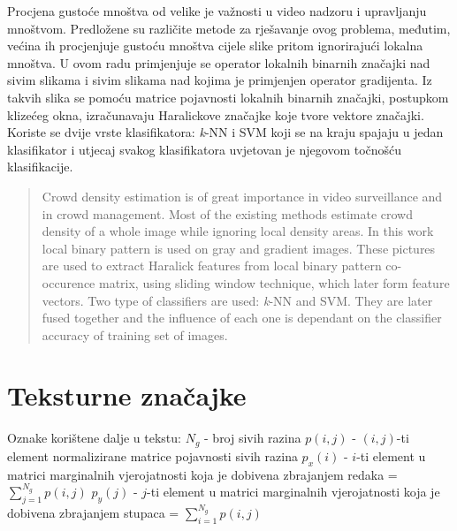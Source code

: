 \documentclass[times, utf8, zavrsni, numeric]{fer}
\begin{document}



\listoffigures
\listoftables

\begin{sazetak}
Procjena gustoće mnoštva od velike je važnosti u video nadzoru i upravljanju mnoštvom. Predložene
su različite metode za rješavanje ovog problema, međutim, većina ih procjenjuje gustoću mnoštva
cijele slike pritom ignorirajući lokalna mnoštva. U ovom radu primjenjuje se operator lokalnih binarnih
značajki nad sivim slikama i sivim slikama nad kojima je primjenjen operator gradijenta. Iz takvih slika
se pomoću matrice pojavnosti lokalnih binarnih značajki, postupkom klizećeg okna, izračunavaju
 Haralickove značajke koje tvore vektore značajki. Koriste se dvije vrste klasifikatora: \textit{k}-NN i SVM koji 
se na kraju spajaju u jedan klasifikator i utjecaj svakog klasifikatora uvjetovan je njegovom točnošću 
klasifikacije.

\end{sazetak}

\begin{abstract}
Crowd density estimation is of great importance in video surveillance and in crowd management. 
Most of the existing methods estimate crowd density of a whole image while ignoring local density areas.
In this work local binary pattern is used on gray and gradient images. These pictures are used to 
extract Haralick features from local binary pattern co-occurence matrix, using sliding window
technique, which later form feature vectors. Two type of classifiers are used: \textit{k}-NN and SVM.
They are later fused together and the influence of each one is dependant on the classifier accuracy of 
training set of images.

\end{abstract}

\appendix

\chapter{Teksturne značajke}

Oznake korištene dalje u tekstu:
\bigbreak
\(N_g\) - broj sivih razina
\(p(i,j)\) - \((i,j)\)-ti element normalizirane matrice pojavnosti sivih razina
\bigbreak
\(p_x(i)\) - \(i\)-ti element u matrici marginalnih vjerojatnosti koja je dobivena 
zbrajanjem redaka = \(\sum_{j=1}^{N_g}p(i,j)\)
\bigbreak
\(p_y(j)\) - \(j\)-ti element u matrici marginalnih vjerojatnosti koja je dobivena 
zbrajanjem stupaca = \(\sum_{i=1}^{N_g}p(i,j)\)
\end{document}
